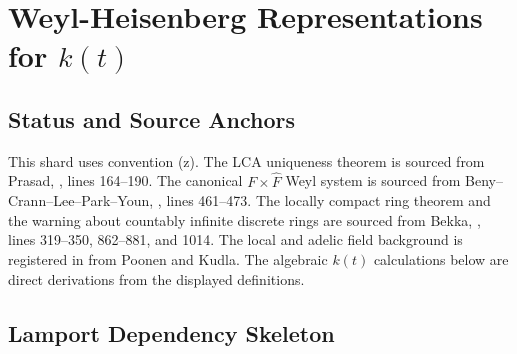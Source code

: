 
\section{Weyl-Heisenberg Representations for \texorpdfstring{\(k(t)\)}{k(t)}}
\label{sec:weyl-heisenberg-representations-for-kt}

\subsection{Status and Source Anchors}

This shard uses convention (z).  The LCA uniqueness theorem is sourced from
Prasad, ,
lines 164--190.  The canonical \(F\times\widehat F\) Weyl system is sourced
from Beny--Crann--Lee--Park--Youn,
,
lines 461--473.  The locally compact ring theorem and the warning about
countably infinite discrete rings are sourced from Bekka,
,
lines 319--350, 862--881, and 1014.  The local and adelic field background is
registered in  from Poonen and
Kudla.  The algebraic \(k(t)\) calculations below are direct derivations from
the displayed definitions.

\subsection{Lamport Dependency Skeleton}

